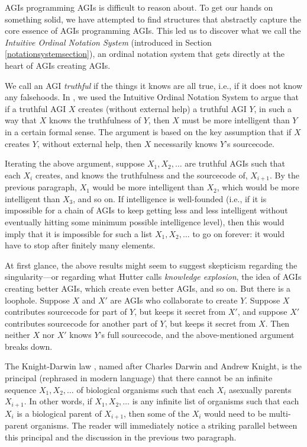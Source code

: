 \documentclass[runningheads]{llncs}
\begin{document}
AGIs programming AGIs is difficult to reason about. To get our hands on something solid,
we have attempted to find structures that abstractly capture the core essence of
AGIs programming AGIs. This led us to discover
what we call the \emph{Intuitive Ordinal Notation System} (introduced in Section
\ref{notationsystemsection}), an ordinal notation system that gets directly at
the heart of AGIs creating AGIs.

We call an AGI \emph{truthful} if the things it knows are all true,
i.e., if it does not know any falsehoods.
In \cite{alexander2019measuring}, we used the Intuitive Ordinal Notation System to argue
that if a truthful AGI $X$ creates (without external help) a truthful AGI $Y$, in such a way
that $X$ knows the truthfulness of $Y$, then $X$ must be more intelligent than $Y$
in a certain formal sense. The argument is based on the key assumption that if $X$
creates $Y$, without external help, then $X$ necessarily knows $Y$'s sourcecode.

Iterating the above argument, suppose $X_1,X_2,\ldots$
are truthful AGIs such that each $X_i$ creates, and knows the truthfulness and
the sourcecode of, $X_{i+1}$. By the previous paragraph, $X_1$ would be more
intelligent than $X_2$, which would be more
intelligent than $X_3$, and so on. If intelligence is well-founded (i.e.,
if it is impossible for a chain of AGIs to keep getting less and less intelligent
without eventually hitting some minimum possible intelligence level),
then this would imply that it is impossible for such
a list $X_1,X_2,\ldots$ to go on forever: it would have to stop after finitely
many elements.

At first glance, the above results might
seem to suggest skepticism regarding the singularity---or regarding
what Hutter \cite{hutter2012} calls \emph{knowledge explosion}, the idea of
AGIs creating better AGIs, which create even better AGIs, and so on.
But there is a loophole. Suppose $X$ and $X'$ are AGIs
who collaborate to create $Y$. Suppose $X$ contributes sourcecode for
part of $Y$, but keeps it secret from $X'$, and suppose $X'$ contributes
sourcecode for another part of $Y$, but keeps it secret from $X$. Then neither
$X$ nor $X'$ knows $Y$'s full sourcecode, and the above-mentioned argument
breaks down.


The Knight-Darwin law \cite{darwin1898knight}, named after Charles Darwin
and Andrew Knight, is the
principal (rephrased in modern language) that there cannot be an infinite
sequence $X_1,X_2,\ldots$ of biological organisms such that each $X_i$ asexually
parents $X_{i+1}$. In other words, if $X_1,X_2,\ldots$ is any infinite list of
organisms such that each $X_i$ is a biological parent of $X_{i+1}$, then some of the
$X_i$ would need to be multi-parent organisms.
The reader will immediately notice a striking parallel between
this principal and the discussion in the previous two paragraph.
\end{document}
